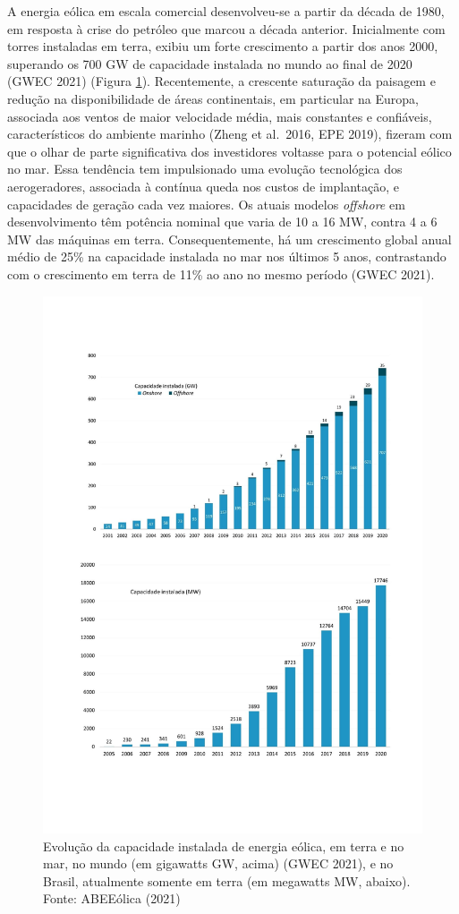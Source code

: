 \documentclass[
  oneside]{scrbook}
\begin{document}
A energia eólica em escala comercial desenvolveu-se a partir da década de 1980, em resposta à crise do petróleo que marcou a década anterior. Inicialmente com torres instaladas em terra, exibiu um forte crescimento a partir dos anos 2000, superando os 700 GW de capacidade instalada no mundo ao final de 2020 (GWEC 2021) (Figura \ref{fig:61}). Recentemente, a crescente saturação da paisagem e redução na disponibilidade de áreas continentais, em particular na Europa, associada aos ventos de maior velocidade média, mais constantes e confiáveis, característicos do ambiente marinho (Zheng et al.~2016, EPE 2019), fizeram com que o olhar de parte significativa dos investidores voltasse para o potencial eólico no mar. Essa tendência tem impulsionado uma evolução tecnológica dos aerogeradores, associada à contínua queda nos custos de implantação, e capacidades de geração cada vez maiores. Os atuais modelos \emph{offshore} em desenvolvimento têm potência nominal que varia de 10 a 16 MW, contra 4 a 6 MW das máquinas em terra. Consequentemente, há um crescimento global anual médio de 25\% na capacidade instalada no mar nos últimos 5 anos, contrastando com o crescimento em terra de 11\% ao ano no mesmo período (GWEC 2021).

\begin{figure}[H]

{\centering \includegraphics[width=0.9\linewidth]{imagens/cap08/Figura_8.1ab} 

}

\caption{Evolução da capacidade instalada de energia eólica, em terra e no mar, no mundo (em gigawatts GW, acima) (GWEC 2021), e no Brasil, atualmente somente em terra (em megawatts MW, abaixo). Fonte: ABEEólica (2021)}\label{fig:61}
\end{figure}
\end{document}
